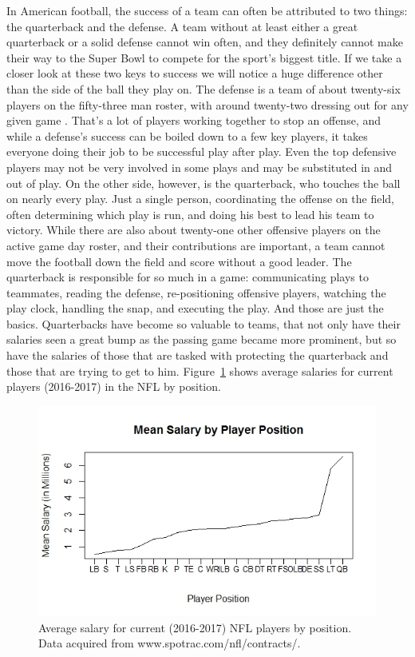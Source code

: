 \documentclass[12pt]{article}\usepackage[]{graphicx}\usepackage[]{color}
\begin{document}
In American football, the success of a team can often be attributed to two things: the quarterback and the defense. A team without at least either a great quarterback or a solid defense cannot win often, and they definitely cannot make their way to the Super Bowl to compete for the sport's biggest title. If we take a closer look at these two keys to success we will notice a huge difference other than the side of the ball they play on. The defense is a team of about twenty-six players on the fifty-three man roster, with around twenty-two dressing out for any given game \cite{anat}. That's a lot of players working together to stop an offense, and while a defense's success can be boiled down to a few key players, it takes everyone doing their job to be successful play after play. Even the top defensive players may not be very involved in some plays and may be substituted in and out of play. On the other side, however, is the quarterback, who touches the ball on nearly every play. Just a single person, coordinating the offense on the field, often determining which play is run, and doing his best to lead his team to victory. While there are also about twenty-one \cite{anat} other offensive players on the active game day roster, and their contributions are important, a team cannot move the football down the field and score without a good leader. The quarterback is responsible for so much in a game: communicating plays to teammates, reading the defense, re-positioning offensive players, watching the play clock, handling the snap, and executing the play. And those are just the basics. Quarterbacks have become so valuable to teams, that not only have their salaries seen a great bump as the passing game became more prominent, but so have the salaries of those that are tasked with protecting the quarterback and those that are trying to get to him. Figure~\ref{fig:sal} shows average salaries for current players (2016-2017) in the NFL by position.

\begin{figure}[h]
\centering
\includegraphics[width=1.2\textwidth]{salary.jpeg}
\captionsetup{font=footnotesize,labelfont=footnotesize}
\caption{\label{fig:sal} Average salary for current (2016-2017) NFL players by position. Data acquired from www.spotrac.com/nfl/contracts/.}
\end{figure}
\end{document}
